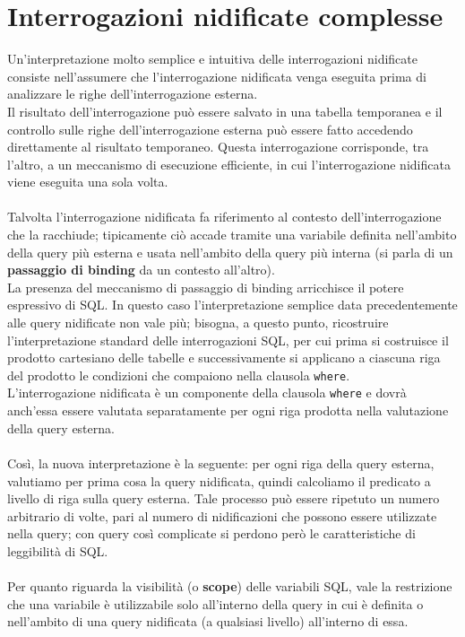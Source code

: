 \section{Interrogazioni nidificate complesse}
Un'interpretazione molto semplice e intuitiva delle interrogazioni nidificate consiste nell'assumere che l'interrogazione nidificata venga eseguita prima di analizzare le righe dell'interrogazione esterna.\\
Il risultato dell'interrogazione può essere salvato in una tabella temporanea e il controllo sulle righe dell'interrogazione esterna può essere fatto accedendo direttamente al risultato temporaneo. Questa interrogazione corrisponde, tra l'altro, a un meccanismo di esecuzione efficiente, in cui l'interrogazione nidificata viene eseguita una sola volta.\\\\
Talvolta l'interrogazione nidificata fa riferimento al contesto dell'interrogazione che la racchiude; tipicamente ciò accade tramite una variabile definita nell'ambito della query più esterna e usata nell'ambito della query più interna (si parla di un \textbf{passaggio di binding} da un contesto all'altro).\\
La presenza del meccanismo di passaggio di binding arricchisce il potere espressivo di SQL. In questo caso l'interpretazione semplice data precedentemente alle query nidificate non vale più; bisogna, a questo punto, ricostruire l'interpretazione standard delle interrogazioni SQL, per cui prima si costruisce il prodotto cartesiano delle tabelle e successivamente si applicano a ciascuna riga del prodotto le condizioni che compaiono nella clausola \texttt{where}.\\
L'interrogazione nidificata è un componente della clausola \texttt{where} e dovrà anch'essa essere valutata separatamente per ogni riga prodotta nella valutazione della query esterna.\\\\
Così, la nuova interpretazione è la seguente: per ogni riga della query esterna, valutiamo per prima cosa la query nidificata, quindi calcoliamo il predicato a livello di riga sulla query esterna. Tale processo può essere ripetuto un numero arbitrario di volte, pari al numero di nidificazioni che possono essere utilizzate nella query; con query così complicate si perdono però le caratteristiche di leggibilità di SQL.\\\\
Per quanto riguarda la visibilità (o \textbf{scope}) delle variabili SQL, vale la restrizione che una variabile è utilizzabile solo all'interno della query in cui è definita o nell'ambito di una query nidificata (a qualsiasi livello) all'interno di essa.\\
